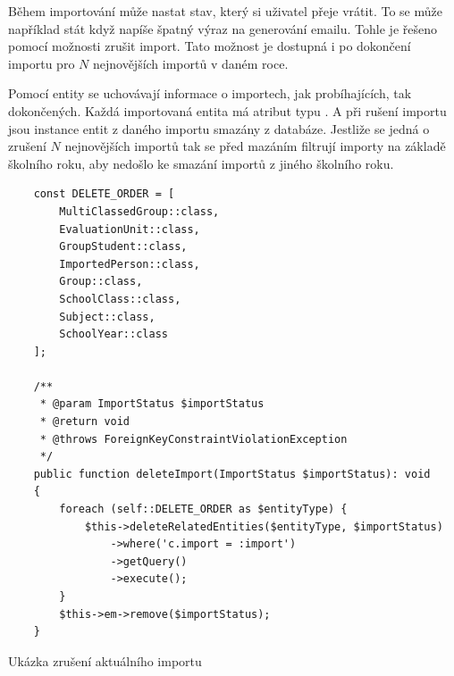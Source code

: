 Během importování může nastat stav, který si uživatel přeje vrátit.
To se může například stát když napíše špatný výraz na generování emailu.
Tohle je řešeno pomocí možnosti zrušit import.
Tato možnost je dostupná i po dokončení importu pro $N$ nejnovějších importů v daném roce.

Pomocí entity  se uchovávají informace o importech, jak probíhajících, tak dokončených.
Každá importovaná entita má atribut  typu  .
A při rušení importu jsou instance entit z daného importu smazány z databáze.
Jestliže se jedná o zrušení $N$ nejnovějších importů tak se před mazáním filtrují importy na základě školního roku, aby nedošlo ke smazání importů z jiného školního roku.


\begin{code}[H]

  \begin{verbatim}
    const DELETE_ORDER = [
        MultiClassedGroup::class,
        EvaluationUnit::class,
        GroupStudent::class,
        ImportedPerson::class,
        Group::class,
        SchoolClass::class,
        Subject::class,
        SchoolYear::class
    ];

    /**
     * @param ImportStatus $importStatus
     * @return void
     * @throws ForeignKeyConstraintViolationException
     */
    public function deleteImport(ImportStatus $importStatus): void
    {
        foreach (self::DELETE_ORDER as $entityType) {
            $this->deleteRelatedEntities($entityType, $importStatus)
                ->where('c.import = :import')
                ->getQuery()
                ->execute();
        }
        $this->em->remove($importStatus);
    }
  \end{verbatim}
  
  \caption{Ukázka zrušení aktuálního importu}

\end{code}
